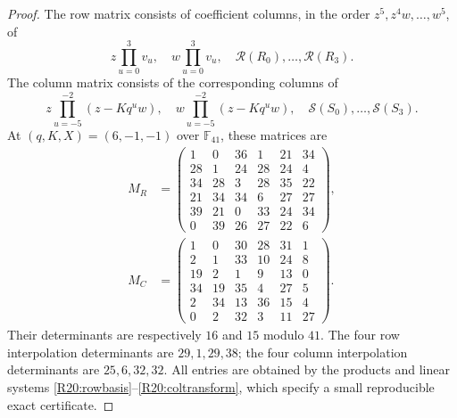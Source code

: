\documentclass[11pt,a4paper]{article}
\theoremstyle{definition}\newtheorem{definition}{Definition}
\begin{document}
\begin{proof}
The row matrix consists of coefficient columns, in the order
$z^5,z^4w,\ldots,w^5$, of
\[
 z\prod_{u=0}^3v_u,\quad w\prod_{u=0}^3v_u,
 \quad\mathcal R(R_0),\ldots,\mathcal R(R_3).
\]
The column matrix consists of the corresponding columns of
\[
 z\prod_{u=-5}^{-2}(z-Kq^uw),\quad
 w\prod_{u=-5}^{-2}(z-Kq^uw),
 \quad\mathcal S(S_0),\ldots,\mathcal S(S_3).
\]
At $(q,K,X)=(6,-1,-1)$ over $\mathbb F_{41}$, these matrices are
\begin{equation}\label{R20:matrices}
 \begin{split}
 M_R&=\begin{pmatrix}
 1&0&36&1&21&34\\28&1&24&28&24&4\\
 34&28&3&28&35&22\\21&34&34&6&27&27\\
 39&21&0&33&24&34\\0&39&26&27&22&6
 \end{pmatrix},\\
 M_C&=\begin{pmatrix}
 1&0&30&28&31&1\\2&1&33&10&24&8\\
 19&2&1&9&13&0\\34&19&35&4&27&5\\
 2&34&13&36&15&4\\0&2&32&3&11&27
 \end{pmatrix}.
 \end{split}
\end{equation}
Their determinants are respectively $16$ and $15$ modulo $41$.
The four row interpolation determinants are $29,1,29,38$;
the four column interpolation determinants are $25,6,32,32$.
All entries are obtained by the products and linear systems
\eqref{R20:rowbasis}--\eqref{R20:coltransform}, which specify a
small reproducible exact certificate.


\end{proof}
\end{document}
